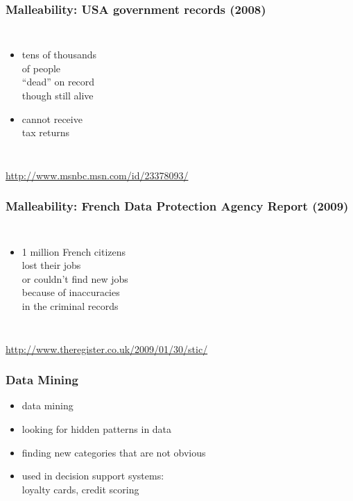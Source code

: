 \documentclass[dvipsnames]{beamer}
\theoremstyle{plain}
\begin{document}
\begin{frame}
  \frametitle{Malleability: USA government records (2008)}

  \begin{columns}

    \begin{itemize}
      \item tens of thousands\\
        of people\\
        ``dead'' on record\\
        though still alive
      \item cannot receive\\
        tax returns
    \end{itemize}
  \end{columns}

  \medskip
  \tiny{\url{http://www.msnbc.msn.com/id/23378093/}}
\end{frame}

\begin{frame}
  \frametitle{Malleability: French Data Protection Agency Report (2009)}

  \begin{columns}

    \begin{itemize}
      \item 1 million French citizens\\
        lost their jobs\\
        or couldn't find new jobs\\
        because of inaccuracies\\
        in the criminal records
    \end{itemize}
  \end{columns}

  \medskip
  \tiny{\url{http://www.theregister.co.uk/2009/01/30/stic/}}
\end{frame}

\begin{frame}
  \frametitle{Data Mining}

  \begin{itemize}
    \item \alert{data mining}
    \item looking for hidden patterns in data
    \item finding new categories that are not obvious

    \medskip
    \item used in decision support systems:\\
      loyalty cards, credit scoring
  \end{itemize}
\end{frame}
\end{document}
